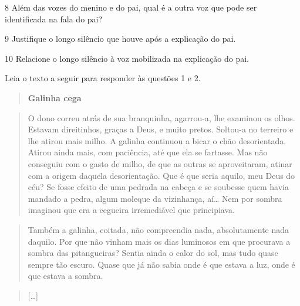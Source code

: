 \num{8} Além das vozes do menino e do pai, qual é a outra voz que pode
ser identificada na fala do pai?


\num{9} Justifique o longo silêncio que houve após a explicação do pai.


\num{10} Relacione o longo silêncio à voz mobilizada na explicação do
pai.



Leia o texto a seguir para responder às questões 1 e 2.

\begin{quote}
\textbf{Galinha cega}
\end{quote}

\begin{quote}
O dono correu atrás de sua branquinha, agarrou-a, lhe examinou os olhos.
Estavam direitinhos, graças a Deus, e muito pretos. Soltou-a no terreiro
e lhe atirou mais milho. A galinha continuou a bicar o chão
desorientada. Atirou ainda mais, com paciência, até que ela se fartasse.
Mas não conseguiu com o gasto de milho, de que as outras se
aproveitaram, atinar com a origem daquela desorientação. Que é que seria
aquilo, meu Deus do céu? Se fosse efeito de uma pedrada na cabeça e se
soubesse quem havia mandado a pedra, algum moleque da vizinhança,
aí\ldots{} Nem por sombra imaginou que era a cegueira irremediável que
principiava.
\end{quote}

\begin{quote}
Também a galinha, coitada, não compreendia nada, absolutamente nada
daquilo. Por que não vinham mais os dias luminosos em que procurava a
sombra das pitangueiras? Sentia ainda o calor do sol, mas tudo quase
sempre tão escuro. Quase que já não sabia onde é que estava a luz, onde
é que estava a sombra.
\end{quote}

\begin{quote}
{[}\ldots{]}
\end{quote}

